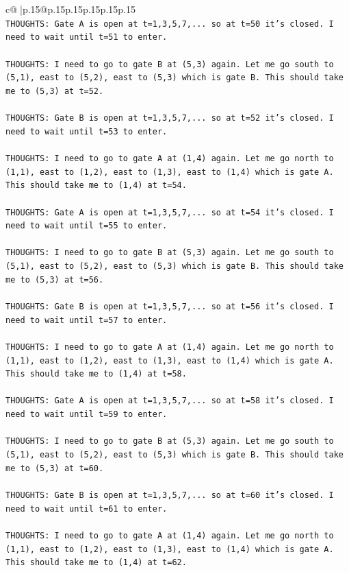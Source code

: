 \documentclass{article}
\begin{document}
{\begin{supertabular}{c@{$\;$}|p{.15\linewidth}@{}p{.15\linewidth}p{.15\linewidth}p{.15\linewidth}p{.15\linewidth}p{.15\linewidth}}
{{{\\ 
\texttt{THOUGHTS: Gate A is open at t=1,3,5,7,... so at t=50 it's closed. I need to wait until t=51 to enter.} \\
\\ 
\texttt{THOUGHTS: I need to go to gate B at (5,3) again. Let me go south to (5,1), east to (5,2), east to (5,3) which is gate B. This should take me to (5,3) at t=52.} \\
\\ 
\texttt{THOUGHTS: Gate B is open at t=1,3,5,7,... so at t=52 it's closed. I need to wait until t=53 to enter.} \\
\\ 
\texttt{THOUGHTS: I need to go to gate A at (1,4) again. Let me go north to (1,1), east to (1,2), east to (1,3), east to (1,4) which is gate A. This should take me to (1,4) at t=54.} \\
\\ 
\texttt{THOUGHTS: Gate A is open at t=1,3,5,7,... so at t=54 it's closed. I need to wait until t=55 to enter.} \\
\\ 
\texttt{THOUGHTS: I need to go to gate B at (5,3) again. Let me go south to (5,1), east to (5,2), east to (5,3) which is gate B. This should take me to (5,3) at t=56.} \\
\\ 
\texttt{THOUGHTS: Gate B is open at t=1,3,5,7,... so at t=56 it's closed. I need to wait until t=57 to enter.} \\
\\ 
\texttt{THOUGHTS: I need to go to gate A at (1,4) again. Let me go north to (1,1), east to (1,2), east to (1,3), east to (1,4) which is gate A. This should take me to (1,4) at t=58.} \\
\\ 
\texttt{THOUGHTS: Gate A is open at t=1,3,5,7,... so at t=58 it's closed. I need to wait until t=59 to enter.} \\
\\ 
\texttt{THOUGHTS: I need to go to gate B at (5,3) again. Let me go south to (5,1), east to (5,2), east to (5,3) which is gate B. This should take me to (5,3) at t=60.} \\
\\ 
\texttt{THOUGHTS: Gate B is open at t=1,3,5,7,... so at t=60 it's closed. I need to wait until t=61 to enter.} \\
\\ 
\texttt{THOUGHTS: I need to go to gate A at (1,4) again. Let me go north to (1,1), east to (1,2), east to (1,3), east to (1,4) which is gate A. This should take me to (1,4) at t=62.} \\
}}}
\end{supertabular}}
\end{document}
